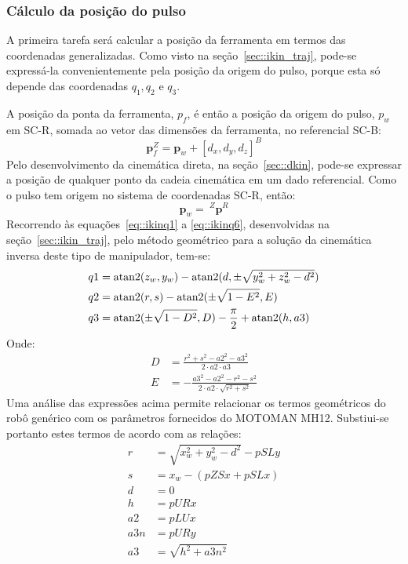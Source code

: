
\subsubsection{Cálculo da posição do pulso}

A primeira tarefa será calcular a posição da ferramenta em termos das
coordenadas generalizadas.
Como visto na seção~\ref{sec::ikin_traj}, pode-se expressá-la convenientemente
pela posição da origem do pulso, porque esta só depende das coordenadas $q_1, q_2$ e $q_3$.

A posição da ponta da ferramenta, $p_{f}$, é então a posição da origem do pulso,
$p_{w}$ em SC-R, somada ao vetor das dimensões da ferramenta, no referencial
SC-B:
\begin{equation}
	\mathbf{p}_{f}^Z = \mathbf{p}_{w} + [d_{x}, d_{y}, d_{z}]^B \label{eq::posf}
\end{equation}
%
Pelo desenvolvimento da cinemática direta, na seção~\ref{sec::dkin}, pode-se
expressar a posição de qualquer ponto da cadeia cinemática em um dado
referencial. Como o pulso tem origem no sistema de coordenadas SC-R, então:
%
\begin{equation} \label{eq::pwpr}
	\mathbf{p}_{w} =~^Z{\mathbf{p}}^R 
\end{equation}
%
Recorrendo às equações~\ref{eq::ikinq1} a \ref{eq::ikinq6}, desenvolvidas na
seção~\ref{sec::ikin_traj}, pelo método geométrico para a solução da cinemática
inversa deste tipo de manipulador, tem-se:
%
\begin{align*}
	q1 &= \operatorname{atan2} (z_w,y_w) - \operatorname{atan2} (d, \pm \sqrt{y_w^2 + z_w^2 - d^2}) \\
	q2 &= \operatorname{atan2} (r,s) - \operatorname{atan2} (\pm  \sqrt{1-E^2}, E) \\
	q3 &= \operatorname{atan2} (\pm \sqrt{1-D^2}, D) - \frac{\pi}{2} + \operatorname{atan2} (h, a3)
\end{align*}
%
Onde:
%
\begin{align*}
	D &= \frac{r^2 + s^2 -a2^2 - a3^2}{2 \cdot a2 \cdot a3} \\
	E &= - \frac{a3^2 - a2^2 - r^2 - s^2}{2 \cdot a2 \cdot \sqrt{r^2 + s^2}}
\end{align*}
%
Uma análise das expressões acima permite relacionar os termos geométricos
do robô genérico com os parâmetros fornecidos do MOTOMAN MH12. Substiui-se
portanto estes termos de acordo com as relações:
%
\begin{align}
	r &= \sqrt{x_w^2 + y_w^2 - d^2} - pSLy \\
	s &= x_w - (pZSx + pSLx) \\
	d &= 0 \\
	h &= pURx \\
	a2 &= pLUx \\
	a3n &= pURy \\
	a3 &= \sqrt{h^2 + a3n^2}
\end{align}
